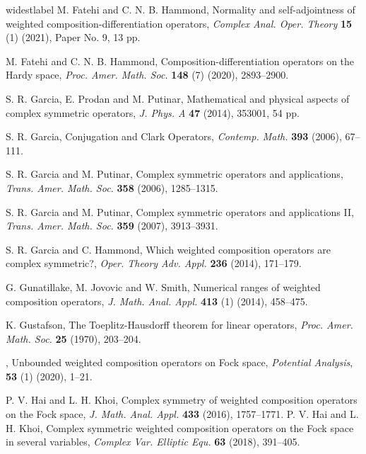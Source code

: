 \documentclass[12pt, reqno]{amsart}
\theoremstyle{definition}
\theoremstyle{remark}
\numberwithin{equation}{section}
\begin{document}
\begin{thebibliography}{widestlabel}
 {\sc M. Fatehi} and {\sc C. N. B. Hammond}, Normality and self-adjointness of weighted composition-differentiation operators, \textit{Complex Anal. Oper. Theory} {\bf 15} (1) (2021), Paper No. 9, 13 pp.

 {\sc M. Fatehi} and {\sc C. N. B. Hammond}, Composition-differentiation operators on the Hardy space, \textit{Proc. Amer. Math. Soc.} {\bf 148} (7) (2020), 2893--2900. 





  {\sc S. R. Garcia, E. Prodan} and {\sc M. Putinar}, Mathematical and physical aspects of complex symmetric operators, \textit{J. Phys. A} {\bf 47} (2014), 353001, 54 pp.


  {\sc S. R. Garcia}, Conjugation and Clark Operators, \textit{Contemp. Math.} {\bf 393} (2006), 67--111.


 {\sc S. R. Garcia} and {\sc M. Putinar}, Complex symmetric operators and applications, \textit{Trans. Amer. Math. Soc.} {\bf 358} (2006), 1285--1315.

 {\sc S. R. Garcia} and {\sc M. Putinar}, Complex symmetric operators and applications II, \textit{Trans. Amer. Math. Soc.} {\bf 359} (2007), 3913--3931.

 {\sc S. R. Garcia} and {\sc C. Hammond}, Which weighted composition operators are complex symmetric?,  \textit{Oper. Theory Adv. Appl.} {\bf236} (2014), 171--179.

 {\sc G. Gunatillake, M. Jovovic} and {\sc W. Smith}, Numerical ranges of weighted composition operators, \textit{J. Math. Anal. Appl.} {\bf 413} (1) (2014), 458--475.


 {\sc K. Gustafson}, The Toeplitz-Hausdorff theorem for linear operators, \textit{Proc. Amer. Math. Soc.} {\bf 25} (1970), 203--204.

, Unbounded weighted composition operators on Fock space, \textit{ Potential Analysis}, {\bf 53} (1) (2020), 1--21.

 {\sc P. V. Hai} and {\sc L. H. Khoi}, Complex symmetry of weighted composition operators on the Fock space, \textit{J. Math. Anal. Appl.} {\bf 433} (2016), 1757--1771.
 {\sc P. V. Hai} and {\sc L. H. Khoi}, Complex symmetric weighted composition operators on the Fock space in several variables, \textit{Complex Var. Elliptic Equ.} {\bf 63} (2018), 391--405.



\end{thebibliography}
\end{document}
